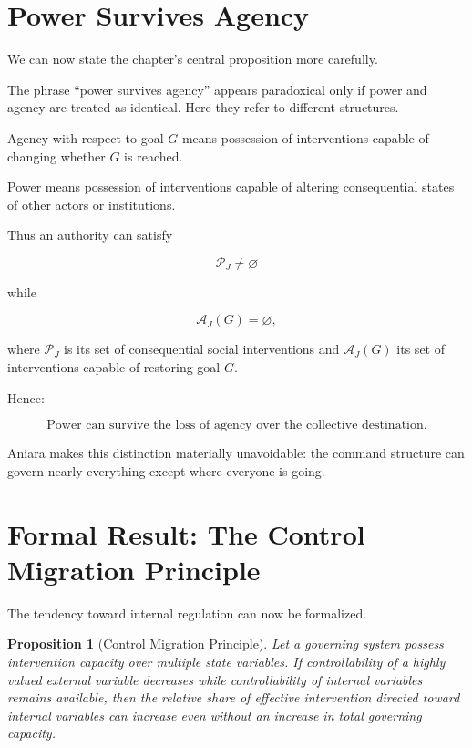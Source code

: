 \documentclass[11pt,oneside]{book}
\newtheorem{proposition}[theorem]{Proposition}
\theoremstyle{definition}
\theoremstyle{remark}
\begin{document}
\section{Power Survives Agency}

We can now state the chapter's central proposition more carefully.

The phrase ``power survives agency'' appears paradoxical only if power and agency are treated as identical. Here they refer to different structures.

Agency with respect to goal \(G\) means possession of interventions capable of changing whether \(G\) is reached.

Power means possession of interventions capable of altering consequential states of other actors or institutions.

Thus an authority can satisfy

\[
\mathcal P_J\neq\varnothing
\]

while

\[
\mathcal A_J(G)=\varnothing,
\]

where \(\mathcal P_J\) is its set of consequential social interventions and \(\mathcal A_J(G)\) its set of interventions capable of restoring goal \(G\).

Hence:

\[
\boxed{
\text{Power can survive the loss of agency over the collective destination.}
}
\]

Aniara makes this distinction materially unavoidable: the command structure can govern nearly everything except where everyone is going.

\section{Formal Result: The Control Migration Principle}

The tendency toward internal regulation can now be formalized.

\begin{proposition}[Control Migration Principle]
Let a governing system possess intervention capacity over multiple state variables. If controllability of a highly valued external variable decreases while controllability of internal variables remains available, then the relative share of effective intervention directed toward internal variables can increase even without an increase in total governing capacity.
\end{proposition}
\end{document}
